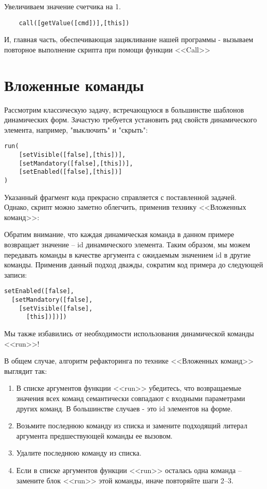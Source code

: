 \documentclass[../index.tex]{subfiles}
\begin{document}
    Увеличиваем значение счетчика на 1.
    
    \begin{verbatim}
    call([getValue([cmd])],[this])
    \end{verbatim}
    
    И, главная часть, обеспечивающая зацикливание нашей программы - вызываем повторное выполнение скрипта при помощи функции
    <<Call>>
    
\section{Вложенные команды}

Рассмотрим классическую задачу, встречающуюся в большинстве шаблонов динамических форм. Зачастую требуется установить ряд свойств динамического элемента, например, "выключить" и "скрыть":
\begin{verbatim}
run(
    [setVisible([false],[this])],
    [setMandatory([false],[this])],
    [setEnabled([false],[this])]
)
\end{verbatim}

Указанный фрагмент кода прекрасно справляется с поставленной задачей. Однако, скрипт можно заметно облегчить, применив технику <<Вложенных команд>>:

Обратим внимание, что каждая динамическая команда в данном примере возвращает значение -- id динамического элемента. Таким образом, мы можем передавать команды в качестве аргумента с ожидаемым значением id в другие команды. Применив данный подход
дважды, сократим код примера до следующей записи:

\begin{verbatim}
setEnabled([false],
  [setMandatory([false],
    [setVisible([false],
      [this])])])
\end{verbatim}

Мы также избавились от необходимости использования динамической команды <<run>>!

В общем случае, алгоритм рефакторинга по технике <<Вложенных команд>> выглядит так:

\begin{enumerate}
    \item В списке аргументов функции <<run>> убедитесь, что возвращаемые значения всех команд семантически совпадают с входными параметрами других команд. В большинстве случаев - это id элементов на форме.
    \item Возьмите последнюю команду из списка и замените подходящий литерал аргумента предшествующей команды ее вызовом.
    \item Удалите последнюю команду из списка.
    \item Если в списке аргументов функции <<run>> осталась одна команда -- замените блок <<run>> этой команды, иначе повторяйте шаги 2--3.
\end{enumerate}
\end{document}
